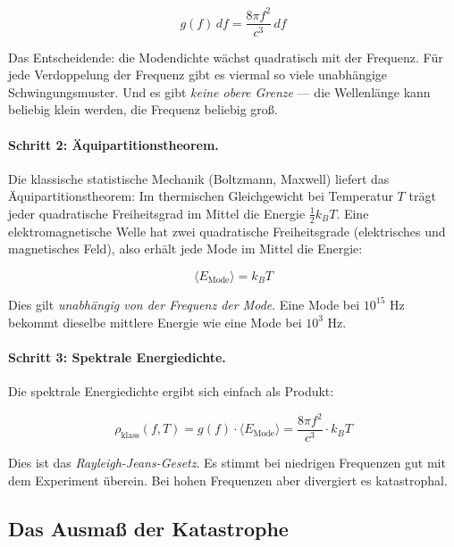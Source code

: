 \begin{equation}
    g(f) \, df = \frac{8\pi f^2}{c^3} \, df
    \label{eq:mode_density}
\end{equation}

Das Entscheidende: die Modendichte wächst quadratisch mit der Frequenz. Für jede 
Verdoppelung der Frequenz gibt es viermal so viele unabhängige Schwingungsmuster. 
Und es gibt \emph{keine obere Grenze} — die Wellenlänge kann beliebig klein werden, 
die Frequenz beliebig groß.

\paragraph{Schritt 2: Äquipartitionstheorem.}
Die klassische statistische Mechanik (Boltzmann, Maxwell) liefert das 
Äquipartitionstheorem: Im thermischen Gleichgewicht bei Temperatur $T$ trägt jeder 
quadratische Freiheitsgrad im Mittel die Energie $\frac{1}{2} k_B T$. Eine 
elektromagnetische Welle hat zwei quadratische Freiheitsgrade (elektrisches und 
magnetisches Feld), also erhält jede Mode im Mittel die Energie:

\begin{equation}
    \langle E_{\text{Mode}} \rangle = k_B T
    \label{eq:equipartition}
\end{equation}

Dies gilt \emph{unabhängig von der Frequenz der Mode}. Eine Mode bei $10^{15}$ Hz 
bekommt dieselbe mittlere Energie wie eine Mode bei $10^3$ Hz.

\paragraph{Schritt 3: Spektrale Energiedichte.}
Die spektrale Energiedichte ergibt sich einfach als Produkt:

\begin{equation}
    \rho_{\text{klass}}(f, T) = g(f) \cdot \langle E_{\text{Mode}} \rangle 
    = \frac{8\pi f^2}{c^3} \cdot k_B T
    \label{eq:rayleigh_jeans}
\end{equation}

Dies ist das \emph{Rayleigh-Jeans-Gesetz}. Es stimmt bei niedrigen Frequenzen gut 
mit dem Experiment überein. Bei hohen Frequenzen aber divergiert es katastrophal.

\subsection{Das Ausmaß der Katastrophe}

